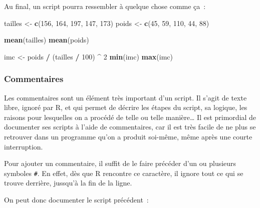 \documentclass[12pt,]{book}
\newenvironment{Shaded}{\begin{snugshade}}{\end{snugshade}}
\newcommand{\DecValTok}[1]{\textcolor[rgb]{0.06,0.06,0.06}{#1}}
\newcommand{\KeywordTok}[1]{\textcolor[rgb]{0.27,0.27,0.27}{\textbf{#1}}}
\newcommand{\NormalTok}[1]{#1}
\newcommand{\OperatorTok}[1]{\textcolor[rgb]{0.43,0.43,0.43}{\textbf{#1}}}
\newcommand{\StringTok}[1]{\textcolor[rgb]{0.5,0.5,0.5}{#1}}
\begin{document}
Au final, un script pourra ressembler à quelque chose comme ça~:

\begin{Shaded}
\begin{Highlighting}[]
\NormalTok{tailles <-}\StringTok{ }\KeywordTok{c}\NormalTok{(}\DecValTok{156}\NormalTok{, }\DecValTok{164}\NormalTok{, }\DecValTok{197}\NormalTok{, }\DecValTok{147}\NormalTok{, }\DecValTok{173}\NormalTok{)}
\NormalTok{poids <-}\StringTok{ }\KeywordTok{c}\NormalTok{(}\DecValTok{45}\NormalTok{, }\DecValTok{59}\NormalTok{, }\DecValTok{110}\NormalTok{, }\DecValTok{44}\NormalTok{, }\DecValTok{88}\NormalTok{)}

\KeywordTok{mean}\NormalTok{(tailles)}
\KeywordTok{mean}\NormalTok{(poids)}

\NormalTok{imc <-}\StringTok{ }\NormalTok{poids }\OperatorTok{/}\StringTok{ }\NormalTok{(tailles }\OperatorTok{/}\StringTok{ }\DecValTok{100}\NormalTok{) }\OperatorTok{^}\StringTok{ }\DecValTok{2}
\KeywordTok{min}\NormalTok{(imc)}
\KeywordTok{max}\NormalTok{(imc)}
\end{Highlighting}
\end{Shaded}

\hypertarget{commentaires}{%
\subsubsection{Commentaires}\label{commentaires}}

Les commentaires sont un élément très important d'un script. Il s'agit de texte libre, ignoré par R, et qui permet de décrire les étapes du script, sa logique, les raisons pour lesquelles on a procédé de telle ou telle manière\ldots{} Il est primordial de documenter ses scripts à l'aide de commentaires, car il est très facile de ne plus se retrouver dans un programme qu'on a produit soi-même, même après une courte interruption.

Pour ajouter un commentaire, il suffit de le faire précéder d'un ou plusieurs symboles \texttt{\#}. En effet, dès que R rencontre ce caractère, il ignore tout ce qui se trouve derrière, jussqu'à la fin de la ligne.

On peut donc documenter le script précédent~:
\end{document}
